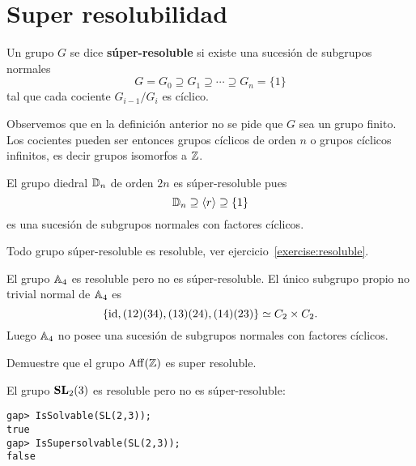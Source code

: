 \chapter{Super resolubilidad}

\label{super}

\begin{definition}
	Un grupo $G$ se dice \textbf{súper-resoluble} si existe una sucesión de
	subgrupos normales
	\[
		G=G_0\supseteq G_1\supseteq\cdots\supseteq G_n=\{1\}
	\]
	tal que cada cociente $G_{i-1}/G_i$ es cíclico.
\end{definition}

Observemos que en la definición anterior no se pide que $G$ sea un grupo finito. Los cocientes
pueden ser entonces grupos cíclicos de orden $n$ o grupos cíclicos infinitos, es decir grupos 
isomorfos a $\mathbb{Z}$. 

\begin{example}
	El grupo diedral $\mathbb{D}_{n}$ de orden $2n$ es súper-resoluble pues 
    \[	
    \mathbb{D}_{n}\supseteq \langle
	r\rangle\supseteq \{1\}
	\]
	es una sucesión de subgrupos normales con factores
	cíclicos.
\end{example}

Todo grupo súper-resoluble es resoluble, ver ejercicio~\ref{exercise:resoluble}.

\begin{example}
	El grupo $\mathbb{A}_4$ es resoluble pero no es súper-resoluble. El único 
	subgrupo propio no trivial normal de $\mathbb{A}_4$ es
	\[
	\{\operatorname{id},(12)(34),(13)(24),(14)(23)\}\simeq C_2\times C_2.
	\]
	Luego $\mathbb{A}_4$ no posee una sucesión de subgrupos normales con factores
	cíclicos.	
\end{example}

\begin{exercise}
    Demuestre que el grupo $\mathrm{Aff}(\mathbb{Z})$ es super resoluble. 
\end{exercise}

\begin{example}
	El grupo $\mathbf{SL}_2(3)$ es resoluble pero no es súper-resoluble:
\begin{lstlisting}
gap> IsSolvable(SL(2,3));
true
gap> IsSupersolvable(SL(2,3));
false
\end{lstlisting}
\end{example}

